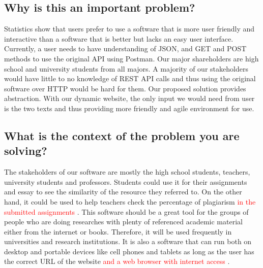 \documentclass{article}
\begin{document}
\subsection*{Why is this an important problem?}
Statistics show that users prefer to use a software that is more user friendly and interactive than a software that is better but lacks an easy user interface. Currently, a user needs to have understanding of JSON, and GET and POST methods to use the original API using Postman. Our major shareholders are high school and university students from all majors. A majority of our stakeholders would have little to no knowledge of REST API calls and thus using the original software over HTTP would be hard for them. Our proposed solution provides abstraction. With our dynamic website, the only input we would need from user is the two texts and thus providing more friendly and agile environment for use.

\subsection*{What is the context of the problem you are solving?}
The stakeholders of our software are mostly the high school students, teachers, university students and professors. Students could use it for their assignments and essay to see the similarity of the resource they referred to. On the other hand, it could be used to help teachers check the percentage of plagiarism \textcolor{red}{in the submitted assignments} . This software should be a great tool for the groups of people who are doing researches with plenty of referenced academic material either from the internet or books. Therefore, it will be used frequently in universities and research institutions. It is also a software that can run both on desktop and portable devices like cell phones and tablets as long as the user has the correct URL of the website \textcolor{red}{and a web browser with internet access} . 
\end{document}
